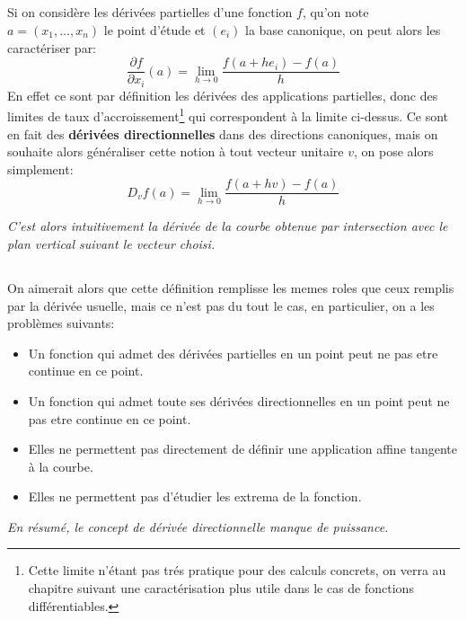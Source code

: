 \subsection*{}
Si on considère les dérivées partielles d'une fonction \(f\), qu'on note \(a = (x_1, \ldots, x_n)\) le point d'étude et \((e_i)\) la base canonique, on peut alors les caractériser par:
\[
   \frac{\partial f}{\partial x_i}(a) = \lim_{h \rightarrow 0} \frac{f(a + he_i) - f(a)}{h}
\] 
En effet ce sont par définition les dérivées des applications partielles, donc des limites de taux d'accroissement\footnote[1]{Cette limite n'étant pas trés pratique pour des calculs concrets, on verra au chapitre suivant une caractérisation plus utile dans le cas de fonctions différentiables.} qui correspondent à la limite ci-dessus.\+
Ce sont en fait des \textbf{dérivées directionnelles} dans des directions canoniques, mais on souhaite alors généraliser cette notion à tout vecteur unitaire \(v\), on pose alors simplement:
\[
   D_vf(a) = \lim_{h \rightarrow 0} \frac{f(a + hv) - f(a)}{h}
\]
\begin{center}
   \textit{C'est alors intuitivement la dérivée de la courbe obtenue par intersection avec le plan vertical suivant le vecteur choisi.}
\end{center}

\subsection*{}
On aimerait alors que cette définition remplisse les memes roles que ceux remplis par la dérivée usuelle, mais ce n'est pas du tout le cas, en particulier, on a les problèmes suivants:
\begin{itemize}
   \item Un fonction qui admet des dérivées partielles en un point peut ne pas etre continue en ce point.
   \item Un fonction qui admet toute ses dérivées directionnelles en un point peut ne pas etre continue en ce point.
   \item Elles ne permettent pas directement de définir une application affine tangente à la courbe.
   \item Elles ne permettent pas d'étudier les extrema de la fonction.
\end{itemize}
\begin{center}
   \textit{En résumé, le concept de dérivée directionnelle manque de puissance.}
\end{center}
